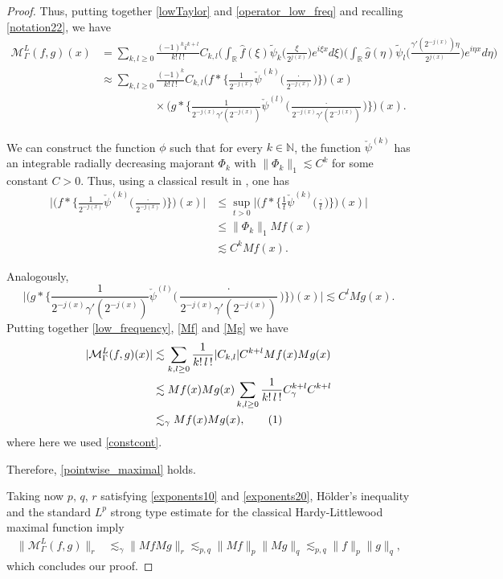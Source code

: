 \documentclass{amsart}
\newcommand{\R}{\mathbb{R}}
\newcommand{\N}{\mathbb{N}}
\newcommand{\M}{\mathcal{M}}
\newcommand\numberthis{\addtocounter{equation}{1}\tag{\theequation}}
\theoremstyle{definition}
\theoremstyle{remark}
\numberwithin{equation}{section}
\begin{document}
\begin{proof}
Thus, putting together \eqref{lowTaylor} and \eqref{operator_low_freq} and recalling \eqref{notation22}, we have
\begin{align}
\M_\Gamma^L(f,g)(x)&=\sum_{k,l\ge0} \frac{(-1)^k i^{k+l}}{k!\,l\,!}C_{k,l} \Big(\int_\R \hat{f}(\xi)\tilde\psi_k\Big(\frac{\xi}{2^{j(x)}}\Big)e^{i\xi x}d\xi\Big) \Big(\int_\R \hat{g}(\eta)\tilde\psi_l\Big(\frac{\gamma'(2^{-j(x)})\eta}{2^{j(x)}}\Big) e^{i\eta x}d\eta\Big)\nonumber\\
&\approx\sum_{k,l\ge0} \frac{(-1)^k }{k!\,l\,!}C_{k,l} \Big(f*\Big\{\frac{1}{2^{-j(x)}}\check{\psi}^{(k)}\Big(\frac{\cdot}{2^{-j(x)}}\Big)\Big\}\Big)(x)\label{low_frequency}\\
&\hspace{2cm}\times \Big(g*\Big\{\frac{1}{2^{-j(x)}\gamma'(2^{-j(x)})}\check{\psi}^{(l)} \Big(\frac{\cdot}{2^{-j(x)}\gamma'(2^{-j(x)})}\Big)\Big\}\Big)(x).\nonumber
\end{align}

We can construct the function $\phi$ such that for every $k\in\N$, the function $\check{\psi}^{(k)}$ has an integrable radially decreasing majorant $\Phi_k$ with $\|\Phi_k\|_1\lesssim C^k$ for some constant $C>0$. Thus, using a classical result in \cite{stein1993harmonic}, one has
\begin{align}
\Big|\Big(f*\Big\{\frac{1}{2^{-j(x)}}\check{\psi}^{(k)}\Big(\frac{\cdot}{2^{-j(x)}}\Big)\Big\}\Big)(x)\Big|&\le \sup_{t>0} \Big|\Big(f*\Big\{\frac{1}{t}\check{\psi}^{(k)}\Big(\frac{\cdot}{t}\Big)\Big\}\Big)(x)\Big|\nonumber\\
&\le \|\Phi_k\|_1 Mf(x)\nonumber\\
&\lesssim C^k Mf(x).\label{Mf}
\end{align}

Analogously,
\begin{equation}\label{Mg}
\Big|\Big(g*\Big\{\frac{1}{2^{-j(x)}\gamma'(2^{-j(x)})}\check{\psi}^{(l)} \Big(\frac{\cdot}{2^{-j(x)}\gamma'(2^{-j(x)})}\Big)\Big\}\Big)(x)\Big|\lesssim C^l Mg(x).
\end{equation}
Putting together \eqref{low_frequency}, \eqref{Mf} and \eqref{Mg} we have
\begin{align*}
|\M_\Gamma^L(f,g)(x)|&\lesssim \sum\limits_{k,l\ge0}\frac{1}{k!\,l\,!}|C_{k,l}|C^{k+l}Mf(x)Mg(x)\\
&\lesssim Mf(x)Mg(x)\sum\limits_{k,l\ge0}\frac{1}{k!\,l\,!}C_\gamma^{k+l} C^{k+l}\\
&\lesssim_\gamma Mf(x)Mg(x),\numberthis\label{pointwise_result}
\end{align*}
where here we used \eqref{constcont}.

Therefore, \eqref{pointwise_maximal} holds.

Taking now $p,\, q,\, r$ satisfying \eqref{exponents10} and \eqref{exponents20}, H\"older’s inequality and the standard $L^p$ strong type estimate for the classical Hardy-Littlewood maximal function imply
 \begin{align*}
\|\M_\Gamma^L(f,g)\|_r&\lesssim_\gamma\|Mf Mg\|_r\lesssim_{p,q} \|Mf\|_p\|Mg\|_q\lesssim_{p,q} \|f\|_p \|g\|_q,
 \end{align*}
which concludes our proof.
\end{proof}
\end{document}
